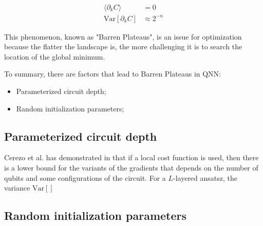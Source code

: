 \begin{align}
    \langle \partial_k C\rangle &= 0  \label{Vanish Gradient}\\
    \mathrm{Var}[\partial_k C] &\approx 2^{-n}  \label{Variance expo smaller}
\end{align}

This phenomenon, known as "Barren Plateaus", is an issue for optimization because the flatter the landscape is, the more challenging it is to search the location of the global minimum.

To summary, there are factors that lead to Barren Plateaus in QNN:
\begin{itemize}
    \item Parameterized circuit depth;
    \item Random initialization parameters;
\end{itemize}

\subsection{Parameterized circuit depth}


Cerezo et al. has demonstrated in \cite{cerezoCostFunctionDependent2021} that if a local cost function is used, then there is a lower bound for the variants of the gradients that depends on the number of qubits and some configurations of the circuit. For a $L$-layered ansatsz, the variance $\mathrm{Var}[]$

\subsection{Random initialization parameters}